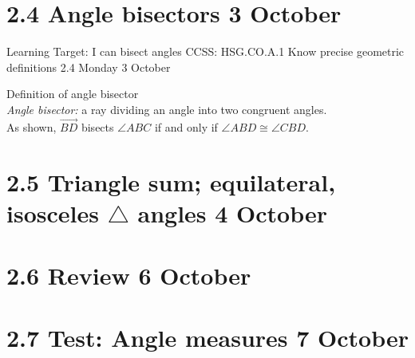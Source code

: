 \section{2.4 Angle bisectors \hfill 3 October}
\begin{frame}{Learning Target: I can bisect angles}
  {CCSS: HSG.CO.A.1 Know precise geometric definitions  \hfill \alert{2.4 Monday 3 October}}

  Definition of angle bisector\\
  \emph{Angle bisector:} a ray dividing an angle into two congruent angles.\\[0.5cm]
  As shown, $\overrightarrow{BD}$ bisects $\angle ABC$ if and only if $\angle ABD \cong \angle CBD$. 
  \begin{center}
    \end{center}
  \end{frame}


\section{2.5 Triangle sum; equilateral, isosceles $\triangle$ angles \hfill 4 October}

\section{2.6 Review \hfill 6 October}

\section{2.7 Test: Angle measures \hfill 7 October}

